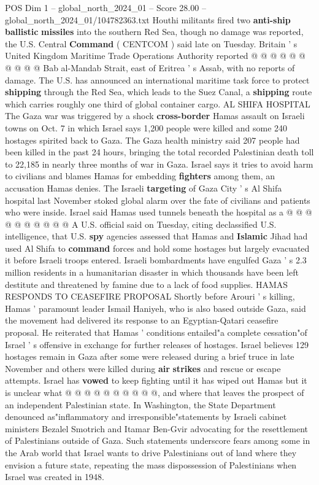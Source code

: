 \begin{textsample}{POS Dim 1 – global\_north\_2024\_01 – Score 28.00 – global\_north\_2024\_01/104782363.txt}
Houthi militants fired two \textbf{anti-ship} \textbf{ballistic} \textbf{missiles} into the southern Red Sea, though no damage was reported, the U.S.
Central \textbf{Command} ( CENTCOM ) said late on Tuesday.
Britain ' s United Kingdom Maritime Trade Operations Authority reported @ @ @ @ @ @ @ @ @ @ Bab al-Mandab Strait, east of Eritrea ' s Assab, with no reports of damage.
The U.S. has announced an international maritime task force to protect \textbf{shipping} through the Red Sea, which leads to the Suez Canal, a \textbf{shipping} route which carries roughly one third of global container cargo.
AL SHIFA HOSPITAL The Gaza war was triggered by a shock \textbf{cross-border} Hamas assault on Israeli towns on Oct. 7 in which Israel says 1,200 people were killed and some 240 hostages spirited back to Gaza.
The Gaza health ministry said 207 people had been killed in the past 24 hours, bringing the total recorded Palestinian death toll to 22,185 in nearly three months of war in Gaza.
Israel says it tries to avoid harm to civilians and blames Hamas for embedding \textbf{fighters} among them, an accusation Hamas denies.
The Israeli \textbf{targeting} of Gaza City ' s Al Shifa hospital last November stoked global alarm over the fate of civilians and patients who were inside.
Israel said Hamas used tunnels beneath the hospital as a @ @ @ @ @ @ @ @ @ @ A U.S. official said on Tuesday, citing declassified U.S. intelligence, that U.S. \textbf{spy} agencies assessed that Hamas and \textbf{Islamic} Jihad had used Al Shifa to \textbf{command} forces and hold some hostages but largely evacuated it before Israeli troops entered.
Israeli bombardments have engulfed Gaza ' s 2.3 million residents in a humanitarian disaster in which thousands have been left destitute and threatened by famine due to a lack of food supplies.
HAMAS RESPONDS TO CEASEFIRE PROPOSAL Shortly before Arouri ' s killing, Hamas ' paramount leader Ismail Haniyeh, who is also based outside Gaza, said the movement had delivered its response to an Egyptian-Qatari ceasefire proposal.
He reiterated that Hamas ' conditions entailed"a complete cessation"of Israel ' s offensive in exchange for further releases of hostages.
Israel believes 129 hostages remain in Gaza after some were released during a brief truce in late November and others were killed during \textbf{air} \textbf{strikes} and rescue or escape attempts.
Israel has \textbf{vowed} to keep fighting until it has wiped out Hamas but it is unclear what @ @ @ @ @ @ @ @ @ @, and where that leaves the prospect of an independent Palestinian state.
In Washington, the State Department denounced as"inflammatory and irresponsible"statements by Israeli cabinet ministers Bezalel Smotrich and Itamar Ben-Gvir advocating for the resettlement of Palestinians outside of Gaza.
Such statements underscore fears among some in the Arab world that Israel wants to drive Palestinians out of land where they envision a future state, repeating the mass dispossession of Palestinians when Israel was created in 1948.


\end{textsample}
